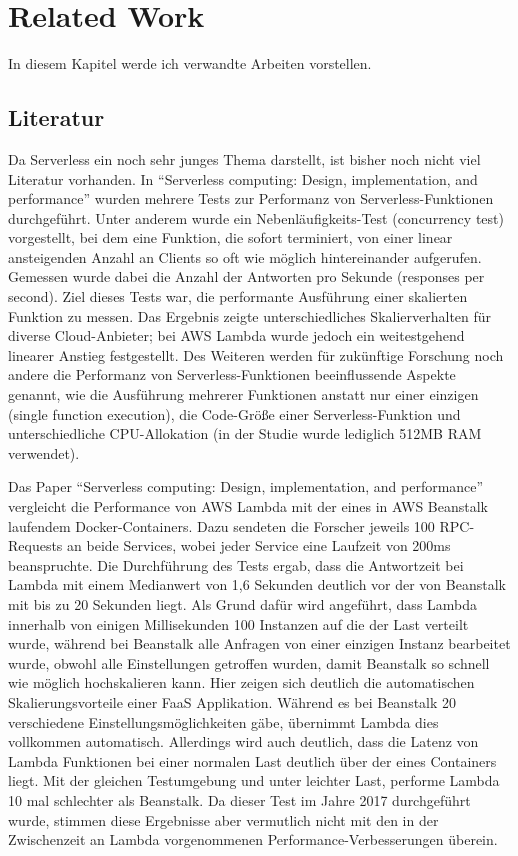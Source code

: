 \chapter{Related Work}
In diesem Kapitel werde ich verwandte Arbeiten vorstellen.

\section{Literatur}
Da Serverless ein noch sehr junges Thema darstellt, ist bisher noch nicht viel Literatur vorhanden. In "`Serverless computing: Design, implementation, and performance"'\cite{mcgrath_serverless_2017} wurden mehrere Tests zur Performanz von Serverless-Funktionen durchgeführt. Unter anderem wurde ein Nebenläufigkeits-Test (concurrency test) vorgestellt, bei dem eine Funktion, die sofort terminiert, von einer linear ansteigenden Anzahl an Clients so oft wie möglich hintereinander aufgerufen. Gemessen wurde dabei die Anzahl der Antworten pro Sekunde (responses per second). Ziel dieses Tests war, die performante Ausführung einer skalierten Funktion zu messen. Das Ergebnis zeigte unterschiedliches Skalierverhalten für diverse Cloud-Anbieter; bei AWS Lambda wurde jedoch ein weitestgehend linearer Anstieg festgestellt. 
Des Weiteren werden für zukünftige Forschung noch andere die Performanz von Serverless-Funktionen beeinflussende Aspekte genannt, wie die Ausführung mehrerer Funktionen anstatt nur einer einzigen (single function execution), die Code-Größe einer Serverless-Funktion und unterschiedliche CPU-Allokation (in der Studie wurde lediglich 512MB RAM verwendet).

Das Paper "`Serverless computing: Design, implementation, and performance"'\cite{hendrickson_serverless_2017} vergleicht die Performance von AWS Lambda mit der eines in AWS Beanstalk laufendem Docker-Containers. Dazu sendeten die Forscher jeweils 100 RPC-Requests an beide Services, wobei jeder Service eine Laufzeit von 200ms beanspruchte. Die Durchführung des Tests ergab, dass die Antwortzeit bei Lambda mit einem Medianwert von 1,6 Sekunden deutlich vor der von Beanstalk mit bis zu 20 Sekunden liegt. Als Grund dafür wird angeführt, dass Lambda innerhalb von einigen Millisekunden 100 Instanzen auf die der Last verteilt wurde, während bei Beanstalk alle Anfragen von einer einzigen Instanz bearbeitet wurde, obwohl alle Einstellungen getroffen wurden, damit Beanstalk so schnell wie möglich hochskalieren kann. Hier zeigen sich deutlich die automatischen Skalierungsvorteile einer FaaS Applikation. Während es bei Beanstalk 20 verschiedene Einstellungsmöglichkeiten gäbe, übernimmt Lambda dies vollkommen automatisch.
Allerdings wird auch deutlich, dass die Latenz von Lambda Funktionen bei einer normalen Last deutlich über der eines Containers liegt. Mit der gleichen Testumgebung und unter leichter Last, performe Lambda 10 mal schlechter als Beanstalk. Da dieser Test im Jahre 2017 durchgeführt wurde, stimmen diese Ergebnisse aber vermutlich nicht mit den in der Zwischenzeit an Lambda vorgenommenen Performance-Verbesserungen überein.

